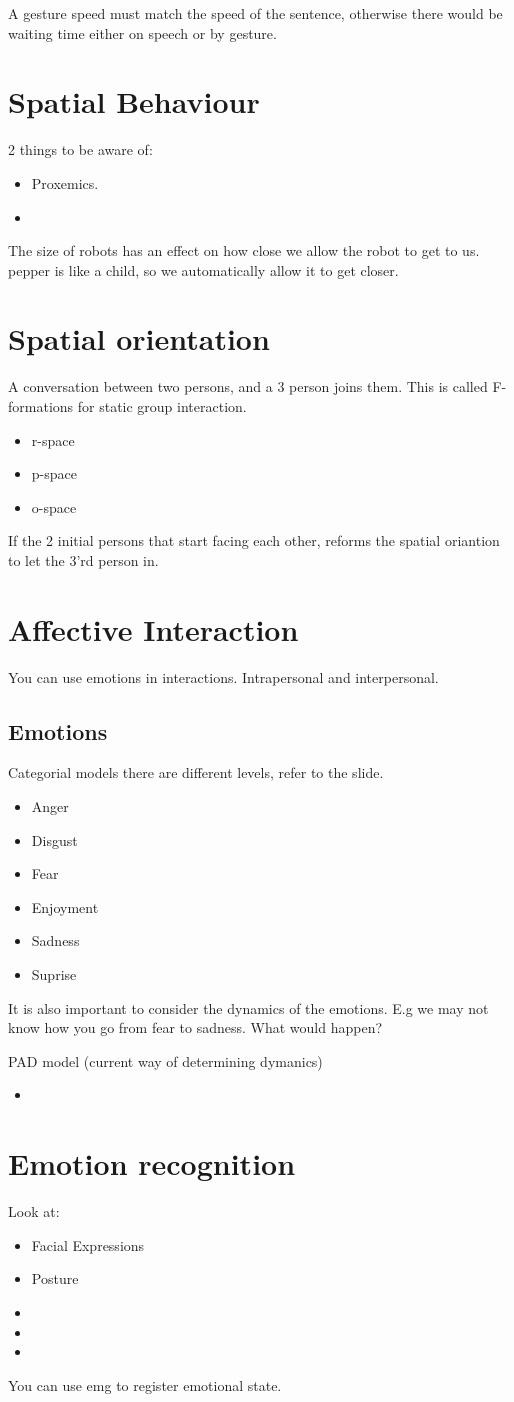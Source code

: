 \documentclass[a4paper]{article}
\begin{document}
A gesture speed must match the speed of the sentence, otherwise there would be waiting time either on speech or by gesture. 

\section{Spatial Behaviour}
2 things to be aware of:
\begin{itemize}
	\item Proxemics.
	\item 
\end{itemize}
The size of robots has an effect on how close we allow the robot to get to us. pepper is like a child, so we automatically allow it to get closer. 

\section{Spatial orientation}
A conversation between two persons, and a 3 person joins them. This is called F-formations for static group interaction. 
\begin{itemize}
	\item r-space
	\item p-space
	\item o-space 
\end{itemize}
If the 2 initial persons that start facing each other, reforms the spatial oriantion to let the 3'rd person in. 

\section{Affective Interaction}
You can use emotions in interactions. Intrapersonal and interpersonal.

\subsection{Emotions}
Categorial models there are different levels, refer to the slide.
\begin{itemize}
	\item Anger
	\item Disgust
	\item Fear
	\item Enjoyment
	\item Sadness
	\item Suprise
\end{itemize}

It is also important to consider the dynamics of the emotions. E.g we may not know how you go from fear to sadness. What would happen?

PAD model (current way of determining dymanics)
\begin{itemize}
	\item 
\end{itemize}


\section{Emotion recognition}
Look at:
\begin{itemize}
	\item Facial Expressions
	\item Posture
	\item 
	\item 
	\item 
\end{itemize}
You can use emg to register emotional state. 
\end{document}
